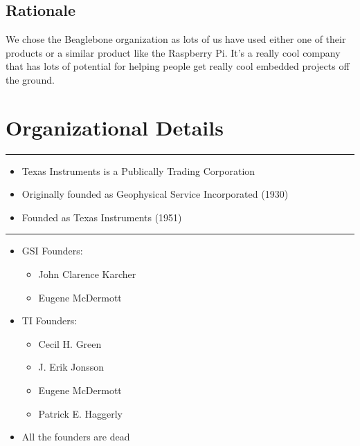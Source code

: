 \subsection{Rationale}\label{rationale}

We chose the Beaglebone organization as lots of us have used either one
of their products or a similar product like the Raspberry Pi. It's a
really cool company that has lots of potential for helping people get
really cool embedded projects off the ground.

\section{Organizational Details}\label{organizational-details}

\begin{center}\rule{3in}{0.4pt}\end{center}

\begin{itemize}
\itemsep1pt\parskip0pt
\item
  Texas Instruments is a Publically Trading Corporation
\item
  Originally founded as Geophysical Service Incorporated (1930)
\item
  Founded as Texas Instruments (1951)
\end{itemize}

\begin{center}\rule{3in}{0.4pt}\end{center}

\begin{itemize}
\itemsep1pt\parskip0pt
\item
  GSI Founders:

  \begin{itemize}
  \itemsep1pt\parskip0pt
  \item
    John Clarence Karcher
  \item
    Eugene McDermott
  \end{itemize}
\item
  TI Founders:

  \begin{itemize}
  \itemsep1pt\parskip0pt
  \item
    Cecil H. Green
  \item
    J. Erik Jonsson
  \item
    Eugene McDermott
  \item
    Patrick E. Haggerly
  \end{itemize}
\item
  All the founders are dead
\end{itemize}

